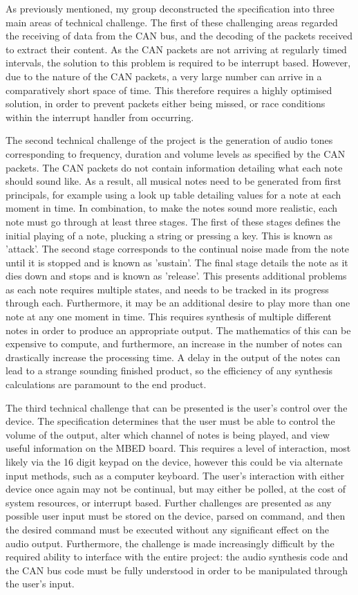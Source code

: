 As previously mentioned, my group deconstructed the specification into three 
main areas of technical challenge. The first of these challenging areas regarded 
the receiving of data from the CAN bus, and the decoding of the packets received
to extract their content. As the CAN packets are not arriving at regularly 
timed intervals, the solution to this problem is required to be interrupt based. 
However, due to the nature of the CAN packets, a very large number can arrive in 
a comparatively short space of time. This therefore requires a highly optimised 
solution, in order to prevent packets either being missed, or race conditions 
within the interrupt handler from occurring. 
\par\bigskip\noindent
The second technical challenge of the project is the generation of audio tones 
corresponding to frequency, duration and volume levels as specified by the CAN 
packets. The CAN packets do not contain information detailing what each note 
should sound like. As a result, all musical notes need to be generated from 
first principals, for example using a look up table detailing values for a note 
at each moment in time. In combination, to make the notes sound more realistic, 
each note must go through at least three stages. The first of these stages 
defines the initial playing of a note, plucking a string or pressing a key. This
 is known as 'attack'. The second stage corresponds to the continual noise made 
from the note until it is stopped and is known as 'sustain'. The final stage 
details the note as it dies down and stops and is known as 'release'. This 
presents additional problems as each note requires multiple states, and needs to 
be tracked in its progress through each. 
Furthermore, it may be an additional desire to play more than one note at any 
one moment in time. This requires synthesis of multiple different notes in order 
to produce an appropriate output. The mathematics of this can be expensive to 
compute, and furthermore, an increase in the number of notes can drastically 
increase the processing time. A delay in the output of the notes can lead to 
a strange sounding finished product, so the efficiency of any synthesis 
calculations are paramount to the end product. 
\par\bigskip\noindent
The third technical challenge that can be presented is the user's control over 
the device. The specification determines that the user must be able to control 
the volume of the output, alter which channel of notes is being played, 
and view useful information on the MBED board. This requires a level of
interaction, most likely via the 16 digit keypad on the device, however this 
could be via alternate input methods, such as a computer keyboard. The user's 
interaction with either device once again may not be continual, but may either 
be polled, at the cost of system resources, or interrupt based. Further 
challenges are presented as any possible user input must be stored on the device, 
parsed on command, and then the desired command must be executed without any 
significant effect on the audio output. Furthermore, the challenge is made 
increasingly difficult by the required ability to interface with the entire 
project: the audio synthesis code and the CAN bus code must be fully understood 
in order to be manipulated through the user's input. 
